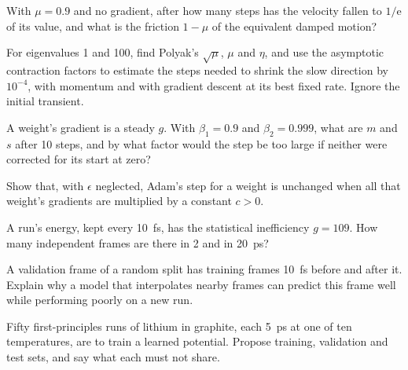\begin{exercise}
\label{ex:lo-memory}
With $\mu = 0.9$ and no gradient, after how many steps has the velocity
fallen to $1/\mathrm{e}$ of its value, and what is the friction $1 - \mu$
of the equivalent damped motion?
\end{exercise}

\begin{exercise}
\label{ex:lo-polyak}
For eigenvalues 1 and 100, find Polyak's $\sqrt\mu$, $\mu$ and $\eta$, and
use the asymptotic contraction factors to estimate the steps needed to
shrink the slow direction by $10^{-4}$, with momentum and with gradient
descent at its best fixed rate. Ignore the initial transient.
\end{exercise}

\begin{exercise}
\label{ex:lo-adam}
A weight's gradient is a steady $g$. With $\beta_1 = 0.9$ and $\beta_2 =
0.999$, what are $m$ and $s$ after 10 steps, and by what factor would the
step be too large if neither were corrected for its start at zero?
\end{exercise}

\begin{exercise}
\label{ex:lo-scale}
Show that, with $\epsilon$ neglected, Adam's step for a weight is
unchanged when all that weight's gradients are multiplied by a constant
$c > 0$.
\end{exercise}

\begin{exercise}
\label{ex:lo-frames}
A run's energy, kept every \SI{10}{\femto\second}, has the statistical
inefficiency $g = 109$. How many independent frames are there in 2 and
in \SI{20}{\pico\second}?
\end{exercise}

\begin{exercise}
\label{ex:lo-neighbour}
A validation frame of a random split has training frames
\SI{10}{\femto\second} before and after it. Explain why a model that interpolates nearby frames can
predict this frame well while performing poorly on a new run.
\end{exercise}

\begin{exercise}
\label{ex:lo-plan}
Fifty first-principles runs of lithium in graphite, each
\SI{5}{\pico\second} at one of ten temperatures, are to train a learned
potential. Propose training, validation and test sets, and say what each
must not share.
\end{exercise}
